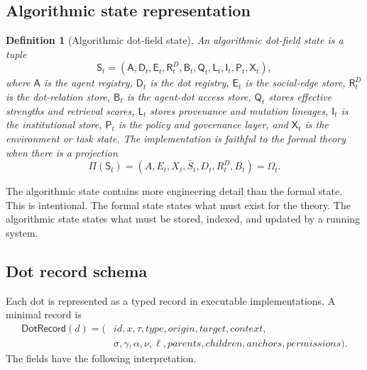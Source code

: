 \documentclass[11pt]{article}
\newtheorem{definition}{Definition}
\theoremstyle{remark}
\begin{document}
\subsection{Algorithmic state representation}\label{algorithmic-state-representation}

\begin{definition}[Algorithmic dot-field state]\label{def:algorithmic-dot-field-state}
An algorithmic dot-field state is a tuple
$$
\mathsf S_t=(\mathsf A,\mathsf D_t,\mathsf E_t,\mathsf R_t^D,\mathsf B_t,
\mathsf Q_t,\mathsf L_t,\mathsf I_t,\mathsf P_t,\mathsf X_t),
$$
where $\mathsf A$ is the agent registry, $\mathsf D_t$ is the dot
registry, $\mathsf E_t$ is the social-edge store, $\mathsf R_t^D$ is the
dot-relation store, $\mathsf B_t$ is the agent-dot access store,
$\mathsf Q_t$ stores effective strengths and retrieval scores,
$\mathsf L_t$ stores provenance and mutation lineages, $\mathsf I_t$ is
the institutional store, $\mathsf P_t$ is the policy and governance
layer, and $\mathsf X_t$ is the environment or task state. The
implementation is faithful to the formal theory when there is a
projection
$$
\Pi(\mathsf S_t)=(A,E_t,X_t,\bar S_t,D_t,R_t^D,B_t)=\Omega_t.
$$
\end{definition}

The algorithmic state contains more engineering detail than the formal
state. This is intentional. The formal state states what must exist for
the theory. The algorithmic state states what must be stored, indexed,
and updated by a running system.

\subsection{Dot record schema}\label{dot-record-schema}

Each dot is represented as a typed record in executable implementations. A minimal record is
$$
\begin{aligned}
\mathsf{DotRecord}(d)=(&id,x,\tau,type,origin,target,context,\\
&\sigma,\gamma,\alpha,\nu,\ell,parents,children,anchors,permissions).
\end{aligned}
$$
The fields have the following interpretation.
\end{document}
